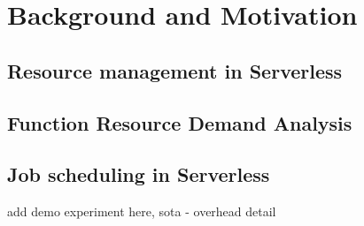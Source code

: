 \section{Background and Motivation}
\label{sec:background}





\subsection{Resource management in Serverless}




\subsection{Function Resource Demand Analysis}
\label{sec:demand-analysis}

\subsection{Job scheduling in Serverless}




add demo experiment here, sota - overhead detail